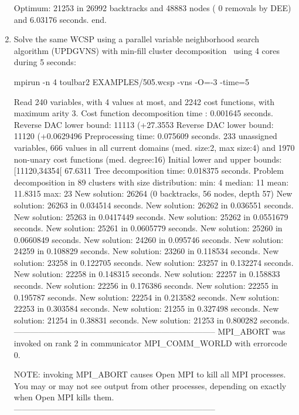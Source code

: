 \begin{enumerate}
{\begin{DoxyCode}
Optimum: 21253 in 26992 backtracks and 48883 nodes ( 0 removals by DEE) and 6.03176 seconds.
end.
\end{DoxyCode}}
\item Solve the same WCSP using a parallel variable neighborhood search algorithm (UPDGVNS) with min-fill cluster decomposition~\cite{Ouali17} using 4 cores during 5 seconds:
\begin{DoxyCode}
	mpirun -n 4 toulbar2 EXAMPLES/505.wcsp -vns -O=-3 -time=5
\end{DoxyCode}
{\scriptsize
\begin{DoxyCode}
Read 240 variables, with 4 values at most, and 2242 cost functions, with maximum arity 3.
Cost function decomposition time : 0.001645 seconds.
Reverse DAC lower bound: 11113 (+27.3553%
Reverse DAC lower bound: 11120 (+0.0629496%
Preprocessing time: 0.075609 seconds.
233 unassigned variables, 666 values in all current domains (med. size:2, max size:4) and 1970 non-unary cost functions (med. degree:16)
Initial lower and upper bounds: [11120,34354[ 67.6311%
Tree decomposition time: 0.018375 seconds.
Problem decomposition in 89 clusters with size distribution: min: 4 median: 11 mean: 11.8315 max: 23
New solution: 26264 (0 backtracks, 56 nodes, depth 57)
New solution: 26263 in 0.034514 seconds.
New solution: 26262 in 0.036551 seconds.
New solution: 25263 in 0.0417449 seconds.
New solution: 25262 in 0.0551679 seconds.
New solution: 25261 in 0.0605779 seconds.
New solution: 25260 in 0.0660849 seconds.
New solution: 24260 in 0.095746 seconds.
New solution: 24259 in 0.108829 seconds.
New solution: 23260 in 0.118534 seconds.
New solution: 23258 in 0.122705 seconds.
New solution: 23257 in 0.132274 seconds.
New solution: 22258 in 0.148315 seconds.
New solution: 22257 in 0.158833 seconds.
New solution: 22256 in 0.176386 seconds.
New solution: 22255 in 0.195787 seconds.
New solution: 22254 in 0.213582 seconds.
New solution: 22253 in 0.303584 seconds.
New solution: 21255 in 0.327498 seconds.
New solution: 21254 in 0.38831 seconds.
New solution: 21253 in 0.800282 seconds.
--------------------------------------------------------------------------
MPI_ABORT was invoked on rank 2 in communicator MPI_COMM_WORLD 
with errorcode 0.

NOTE: invoking MPI_ABORT causes Open MPI to kill all MPI processes.
You may or may not see output from other processes, depending on
exactly when Open MPI kills them.
--------------------------------------------------------------------------


\end{DoxyCode}}
\end{enumerate}
